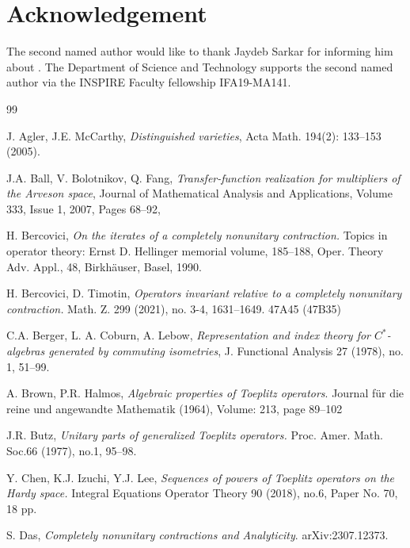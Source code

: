 \documentclass[12pt]{amsart}
\numberwithin{equation}{section}
\theoremstyle{definition}
\newcommand{\1}{{\mbox{\bf 1}}}
\begin{document}
\section*{Acknowledgement}
The second named author would like to thank Jaydeb Sarkar for informing him about \cite[Theorem 3.6, Theorem 3.7]{RR}. The Department of Science and Technology supports the second named author via the INSPIRE Faculty fellowship IFA19-MA141. 

\begin{thebibliography}{99}

J. Agler, J.E. McCarthy,
\emph{Distinguished varieties}, Acta Math. 194(2): 133--153 (2005). 

J.A. Ball, V. Bolotnikov, Q. Fang,
\emph{Transfer-function realization for multipliers of the Arveson space}, Journal of Mathematical Analysis and Applications, Volume 333, Issue 1, 2007, Pages 68--92,

H. Bercovici, 
\emph{On the iterates of a completely nonunitary contraction.} Topics in operator theory: Ernst D. Hellinger memorial volume, 185--188, Oper. Theory Adv. Appl., 48, Birkhäuser, Basel, 1990. 

H. Bercovici, D. Timotin, 
\emph{Operators invariant relative to a completely nonunitary contraction.} Math. Z. 299 (2021), no. 3-4, 1631--1649. 47A45 (47B35)

C.A. Berger, L. A. Coburn, A. Lebow,
\emph{Representation and index theory for $C^*$-algebras generated by commuting isometries}, J. Functional Analysis 27 (1978), no. 1, 51--99.

A. Brown, P.R. Halmos, 
\emph{Algebraic properties of Toeplitz operators}.
Journal für die reine und angewandte Mathematik (1964), Volume: 213, page 89--102

J.R. Butz, 
\emph{Unitary parts of generalized Toeplitz operators.}
Proc. Amer. Math. Soc.66 (1977), no.1, 95--98.

Y. Chen, K.J. Izuchi, Y.J. Lee,
\emph{Sequences of powers of Toeplitz operators on the Hardy space.} Integral Equations Operator Theory 90 (2018), no.6, Paper No. 70, 18 pp.

S. Das, 
\emph{Completely nonunitary contractions and Analyticity}. arXiv:2307.12373.


\end{thebibliography}
\end{document}
